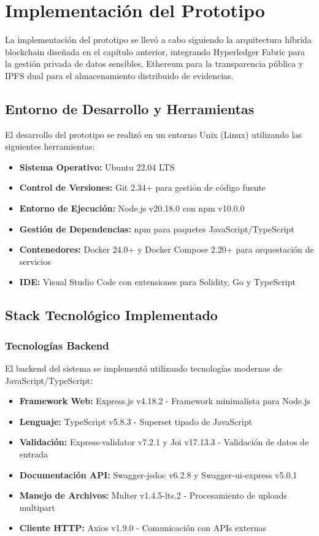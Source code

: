\section{Implementación del Prototipo}

La implementación del prototipo se llevó a cabo siguiendo la arquitectura híbrida blockchain diseñada en el capítulo anterior, integrando Hyperledger Fabric para la gestión privada de datos sensibles, Ethereum para la transparencia pública y IPFS dual para el almacenamiento distribuido de evidencias.

\subsection{Entorno de Desarrollo y Herramientas}

El desarrollo del prototipo se realizó en un entorno Unix (Linux) utilizando las siguientes herramientas:

\begin{itemize}
    \item \textbf{Sistema Operativo:} Ubuntu 22.04 LTS
    \item \textbf{Control de Versiones:} Git 2.34+ para gestión de código fuente
    \item \textbf{Entorno de Ejecución:} Node.js v20.18.0 con npm v10.0.0
    \item \textbf{Gestión de Dependencias:} npm para paquetes JavaScript/TypeScript
    \item \textbf{Contenedores:} Docker 24.0+ y Docker Compose 2.20+ para orquestación de servicios
    \item \textbf{IDE:} Visual Studio Code con extensiones para Solidity, Go y TypeScript
\end{itemize}

\subsection{Stack Tecnológico Implementado}

\subsubsection{Tecnologías Backend}

El backend del sistema se implementó utilizando tecnologías modernas de JavaScript/TypeScript:

\begin{itemize}
    \item \textbf{Framework Web:} Express.js v4.18.2 - Framework minimalista para Node.js
    \item \textbf{Lenguaje:} TypeScript v5.8.3 - Superset tipado de JavaScript
    \item \textbf{Validación:} Express-validator v7.2.1 y Joi v17.13.3 - Validación de datos de entrada
    \item \textbf{Documentación API:} Swagger-jsdoc v6.2.8 y Swagger-ui-express v5.0.1
    \item \textbf{Manejo de Archivos:} Multer v1.4.5-lts.2 - Procesamiento de uploads multipart
    \item \textbf{Cliente HTTP:} Axios v1.9.0 - Comunicación con APIs externas
\end{itemize}

